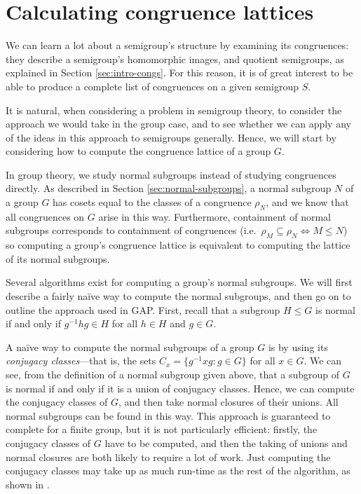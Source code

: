 \chapter{Calculating congruence lattices}
\label{chap:lattice}

We can learn a lot about a semigroup's structure by examining its congruences:
they describe a semigroup's homomorphic images, and quotient semigroups, as
explained in Section \ref{sec:intro-congs}.  For this reason, it is of great
interest to be able to produce a complete list of congruences on a given
semigroup $S$.

It is natural, when considering a problem in semigroup theory, to consider the
approach we would take in the group case, and to see whether we can apply any of
the ideas in this approach to semigroups generally.  Hence, we will start by
considering how to compute the congruence lattice of a group $G$.

In group theory, we study normal subgroups instead of studying congruences
directly.  As described in Section \ref{sec:normal-subgroups}, a normal subgroup
$N$ of a group $G$ has cosets equal to the classes of a congruence $\rho_N$, and
we know that all congruences on $G$ arise in this way.  Furthermore, containment
of normal subgroups corresponds to containment of congruences
(i.e.~$\rho_M \subseteq \rho_N \iff M \leq N$) so computing a group's congruence
lattice is equivalent to computing the lattice of its normal subgroups.

Several algorithms exist for computing a group's normal subgroups.  We will
first describe a fairly na\"ive way to compute the normal subgroups, and then go
on to outline the approach used in GAP.  First, recall that a subgroup
$H \leq G$ is normal if and only if $g^{-1}hg \in H$ for all $h \in H$ and
$g \in G$.

 A na\"ive way to compute the normal subgroups of a group
$G$ is by using its \textit{conjugacy classes}---that is, the sets
$C_x = \{g^{-1}xg : g \in G\}$ for all $x \in G$.  We can see, from the
definition of a normal subgroup given above, that a subgroup of $G$ is normal if
and only if it is a union of conjugacy classes.  Hence, we can compute the
conjugacy classes of $G$, and then take normal closures of their unions.  All
normal subgroups can be found in this way.  This approach is guaranteed to
complete for a finite group, but it is not particularly efficient: firstly, the
conjugacy classes of $G$ have to be computed, and then the taking of unions and
normal closures are both likely to require a lot of work.  Just computing the
conjugacy classes may take up as much run-time as the rest of the algorithm, as
shown in \cite[Table 1]{hulpke_1998}.

